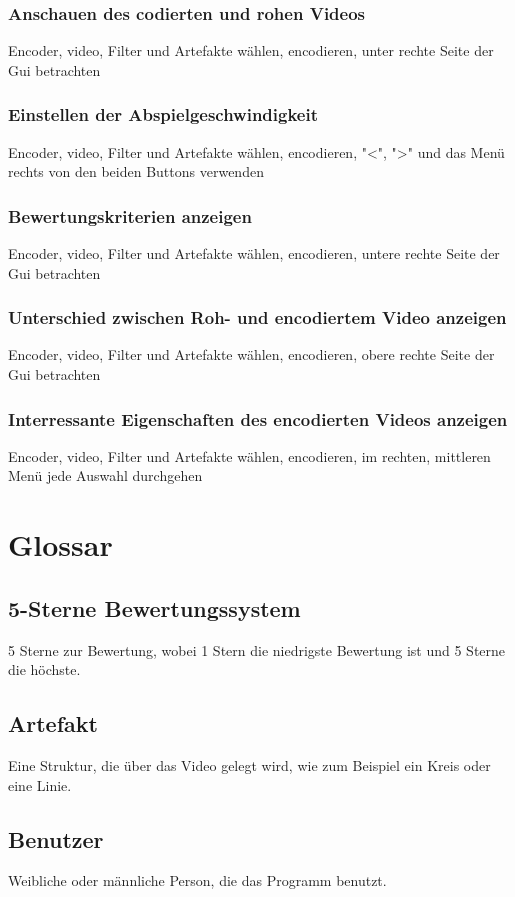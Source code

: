 \documentclass[parskip=full]{scrartcl}
\begin{document}
\subsubsection{Anschauen des codierten und rohen Videos}
Encoder, video, Filter und Artefakte wählen, encodieren, unter rechte Seite der Gui betrachten
\subsubsection{Einstellen der Abspielgeschwindigkeit}
Encoder, video, Filter und Artefakte wählen, encodieren, "<", ">" und das Menü rechts von den beiden Buttons verwenden
\subsubsection{Bewertungskriterien anzeigen}
Encoder, video, Filter und Artefakte wählen, encodieren, untere rechte Seite der Gui betrachten
\subsubsection{Unterschied zwischen Roh- und encodiertem Video anzeigen}
Encoder, video, Filter und Artefakte wählen, encodieren, obere rechte Seite der Gui betrachten
\subsubsection{Interressante Eigenschaften des encodierten Videos anzeigen}
Encoder, video, Filter und Artefakte wählen, encodieren, im rechten, mittleren Menü jede Auswahl durchgehen
\section{Glossar}
\subsection*{5-Sterne Bewertungssystem}  
5 Sterne zur Bewertung, wobei 1 Stern die niedrigste Bewertung ist und 5 Sterne die höchste.

\subsection*{Artefakt} Eine Struktur, die über das Video gelegt wird, wie zum Beispiel ein Kreis oder eine Linie.
\subsection*{Benutzer} 
Weibliche oder männliche Person, die das Programm benutzt.
\end{document}
